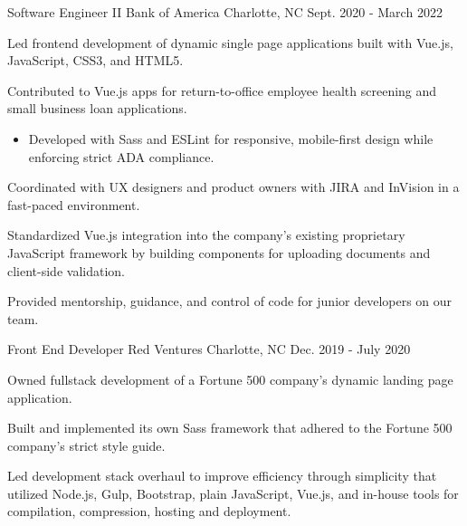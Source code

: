 \begin{cventries}

\cventry
{Software Engineer II} %
{Bank of America} %
{Charlotte, NC} %
{Sept. 2020 - March 2022} %
{
  \begin{cvitems} %
    \item {Led frontend development of dynamic single page applications built with Vue.js, JavaScript, CSS3, and HTML5.}
    \item {Contributed to Vue.js apps for return-to-office employee health screening and small business loan applications.}
    \begin{itemize}
      \vspace{1.0mm}
      \item {Developed with Sass and ESLint for responsive, mobile-first design while enforcing strict ADA compliance.}
    \end{itemize}
    \item {Coordinated with UX designers and product owners with JIRA and InVision in a fast-paced environment.}
    \item {Standardized Vue.js integration into the company's existing proprietary JavaScript framework by building components for uploading documents and client-side validation.}
    \item {Provided mentorship, guidance, and control of code for junior developers on our team.}
  \end{cvitems}
}

  \cventry
    {Front End Developer} %
    {Red Ventures} %
    {Charlotte, NC} %
    {Dec. 2019 - July 2020} %
    {
      \begin{cvitems} %
        \item {Owned fullstack development of a Fortune 500 company's dynamic landing page application.}
        \item {Built and implemented its own Sass framework that adhered to the Fortune 500 company's strict style guide.}
        \item {Led development stack overhaul to improve efficiency through simplicity that utilized Node.js, Gulp, Bootstrap, plain JavaScript, Vue.js, and in-house tools for compilation, compression, hosting and deployment.}
      \end{cvitems}
    }


\end{cventries}

